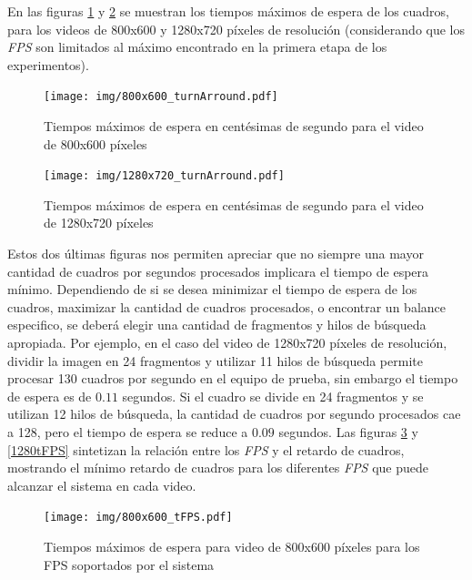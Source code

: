 En las figuras \ref{800turnArround} y \ref{1280turnArround} se muestran los
tiempos máximos de espera de los cuadros, para los videos de 800x600 y 1280x720
píxeles de resolución (considerando que los \emph{FPS} son limitados al máximo
encontrado en la primera etapa de los experimentos).

\begin{figure}[h]

	\texttt{[image: img/800x600\_turnArround.pdf]}
	\caption{Tiempos máximos de espera en centésimas de segundo para el
	video de 800x600 píxeles}
	\label{800turnArround}

\end{figure}


\begin{figure}[h]

	\texttt{[image: img/1280x720\_turnArround.pdf]}
	\caption{Tiempos máximos de espera en centésimas de segundo para el
	video de 1280x720 píxeles}
	\label{1280turnArround}

\end{figure}

Estos dos últimas figuras nos permiten apreciar que no siempre una mayor
cantidad de cuadros por segundos procesados implicara el tiempo de espera
mínimo. Dependiendo de si se desea minimizar el tiempo de espera de los cuadros,
maximizar la cantidad de cuadros procesados, o encontrar un balance especifico,
se deberá elegir una cantidad de fragmentos y hilos de búsqueda apropiada. Por
ejemplo, en el caso del video de 1280x720 píxeles de resolución, dividir la
imagen en 24 fragmentos y utilizar 11 hilos de búsqueda permite procesar 130
cuadros por segundo en el equipo de prueba, sin embargo el tiempo de espera es
de $0.11$ segundos. Si el cuadro se divide en 24 fragmentos y se utilizan 12
hilos de búsqueda, la cantidad de cuadros por segundo procesados cae a 128, pero
el tiempo de espera se reduce a $0.09$ segundos. Las figuras \ref{800tFPS} y
\ref{1280tFPS} sintetizan la relación entre los \emph{FPS} y el retardo de
cuadros, mostrando el mínimo retardo de cuadros para los diferentes \emph{FPS}
que puede alcanzar el sistema en cada video.

\begin{figure}[h]

	\texttt{[image: img/800x600\_tFPS.pdf]}
	\caption{Tiempos máximos de espera para video de 800x600 píxeles para
	los FPS soportados por el sistema}
	\label{800tFPS}

\end{figure}

